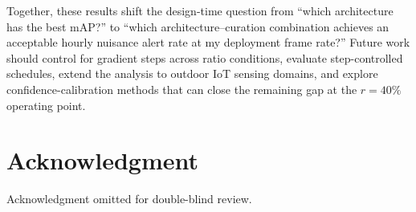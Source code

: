 \documentclass[conference]{IEEEtran}
\begin{document}
Together, these results shift the design-time question from
``which architecture has the best mAP?'' to ``which
architecture--curation combination achieves an acceptable hourly
nuisance alert rate at my deployment frame rate?'' Future work should
control for gradient steps across ratio conditions, evaluate
step-controlled schedules, extend the analysis to outdoor IoT sensing
domains, and explore confidence-calibration methods that can close
the remaining gap at the $r{=}40\%$ operating point.

\section*{Acknowledgment}
Acknowledgment omitted for double-blind review.



\end{document}
